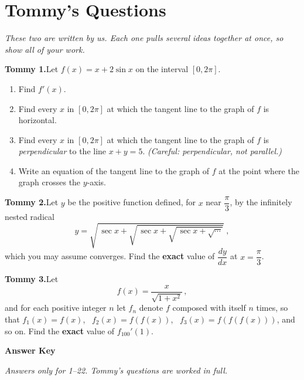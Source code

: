 \documentclass[11pt]{article}
\newcommand{\wsS}{\vspace*{3cm}}    %
\newcommand{\wsM}{\vspace*{4.5cm}}  %
\newcommand{\wsL}{\vspace*{6.5cm}}  %
\begin{document}
\clearpage
\section*{Tommy's Questions}
\noindent\textit{These two are written by us. Each one pulls several ideas together at once,
so show all of your work.}
\medskip

\noindent\textbf{Tommy 1.}\quad Let $f(x)=x+2\sin x$ on the interval $[0,2\pi]$.
\begin{enumerate}[label=\textbf{(\alph*)},leftmargin=2.8em,itemsep=6pt,topsep=5pt]
  \item Find $f'(x)$. \wsS
  \item Find every $x$ in $[0,2\pi]$ at which the tangent line to the graph of $f$ is
        horizontal. \wsM
  \item Find every $x$ in $[0,2\pi]$ at which the tangent line to the graph of $f$ is
        \emph{perpendicular} to the line $x+y=5$.
        \textit{(Careful: perpendicular, not parallel.)} \wsM
  \item Write an equation of the tangent line to the graph of $f$ at the point where the
        graph crosses the $y$-axis. \wsM
\end{enumerate}

\bigskip
\noindent\textbf{Tommy 2.}\quad Let $y$ be the positive function defined, for $x$ near
$\dfrac{\pi}{3}$, by the infinitely nested radical
\[
  y=\sqrt{\,\sec x+\sqrt{\,\sec x+\sqrt{\,\sec x+\sqrt{\cdots}}}}\;,
\]
which you may assume converges. Find the \textbf{exact} value of $\dfrac{dy}{dx}$ at
$x=\dfrac{\pi}{3}$.
\wsL
\wsL

\bigskip
\noindent\textbf{Tommy 3.}\quad Let
\[
  f(x)=\frac{x}{\sqrt{1+x^{2}}}\,,
\]
and for each positive integer $n$ let $f_{n}$ denote $f$ composed with itself $n$ times, so
that $f_{1}(x)=f(x)$, \ $f_{2}(x)=f(f(x))$, \ $f_{3}(x)=f(f(f(x)))$, and so on.
Find the \textbf{exact} value of $f_{100}'(1)$.
\wsL
\wsL

\clearpage
\begin{center}\Large\textbf{Answer Key}\end{center}
\medskip
\noindent\textit{Answers only for 1--22. Tommy's questions are worked in full.}
\medskip
\end{document}
